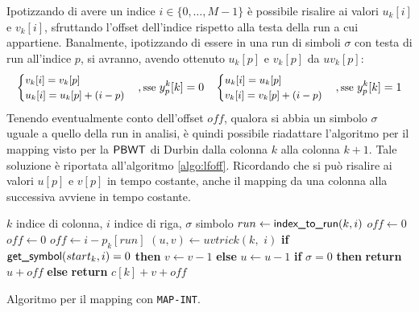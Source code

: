 Ipotizzando di avere
un indice $i\in\{0,\ldots,M-1\}$ è possibile risalire ai valori
$u_k[i]$ e $v_k[i]$, sfruttando l'offset dell'indice rispetto alla
testa della run a cui appartiene. Banalmente, ipotizzando di essere in una run
di simboli $\sigma$ con testa di run all'indice $p$, si avranno, avendo
ottenuto $u_k[p]$ e $v_k[p]$ da $uv_k[p]$:
\begin{equation}
  \small
  \label{eq:naive2}
  \begin{cases}
    v_k[i]=v_k[p]\\
    u_k[i]=u_k[p]+(i-p)
  \end{cases},\mbox{sse } y^k_p[k]=0
  \quad
  \begin{cases}
    u_k[i]=u_k[p]\\
    v_k[i]=v_k[p]+(i-p)
  \end{cases},\mbox{sse } y^k_p[k]=1
\end{equation}
Tenendo eventualmente conto dell'offset $off$, qualora si abbia un simbolo
$\sigma$ uguale a quello della run in analisi, è quindi possibile
riadattare l'algoritmo per il 
mapping visto per la $\mbox{\rm {\sf PBWT}}$ di Durbin dalla colonna $k$ alla colonna
$k+1$. Tale soluzione è riportata all'algoritmo \ref{algo:lfoff}. 
Ricordando che si può risalire ai valori $u[p]$ e $v[p]$ in tempo costante,
anche il mapping da una colonna alla successiva avviene in tempo costante.
\begin{algorithm}
  \begin{algorithmic}[1]
    \Comment $k$ indice di colonna, $i$ indice di riga, $\sigma$ simbolo
    \State $run\gets \mbox{\rm {\sf index\_to\_run}}(k,i)$
    \State $off\gets 0$
    \State $off\gets 0$
    \Else
    \State $off\gets i-p_k[run]$
    \EndIf
    \State $(u,v)\gets uvtrick(k,\,\,i)$
    \State \textbf{if} $\mbox{\rm {\sf get\_symbol}}(start_k, i)=0$ \textbf{then} $v\gets v-1$
    \textbf{else} $u\gets u-1$
    \EndIf
    \State \textbf{if} $\sigma = 0$ \textbf{then} \textbf{return} $u+off$
    \textbf{else} \textbf{return} $c[k]+v+off$
    \EndFunction
  \end{algorithmic}
  \caption{Algoritmo per il mapping con \texttt{MAP-INT}.}
  \label{algo:lfoff}
\end{algorithm}

